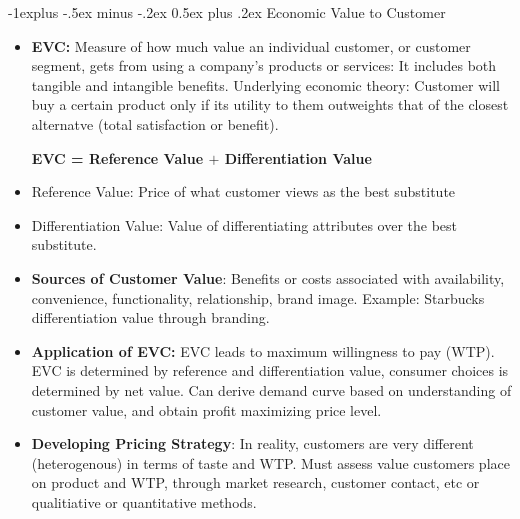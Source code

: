 \documentclass[12pt, landscape]{article}
\makeatletter
\renewcommand{\subsection}{\@startsection{subsection}{2}{0mm}%
                                {-1explus -.5ex minus -.2ex}%
                                {0.5ex plus .2ex}%
                                {\normalfont\normalsize\bfseries}}
\makeatother
\begin{document}
\begin{multicols*}{3}
\subsection{Economic Value to Customer}
\begin{itemize}
\item \textbf{EVC:} Measure of how much value an individual customer, or customer segment, gets from using a company’s products or services: It includes both tangible and intangible benefits. Underlying economic theory: Customer will buy a certain product only if its utility to them outweights that of the closest alternatve (total satisfaction or benefit).
\centerline{\textbf{EVC = Reference Value $+$ Differentiation Value}}
\item Reference Value: Price of what customer views as the best substitute
\item Differentiation Value: Value of differentiating attributes over the best substitute.
\item \textbf{Sources of Customer Value}: Benefits or costs associated with availability, convenience, functionality, relationship, brand image. Example: Starbucks differentiation value through branding. 
\item  \textbf{Application of EVC: } EVC leads to maximum willingness to pay (WTP). EVC is determined by reference and differentiation value, consumer choices is determined by net value. Can derive demand curve based on understanding of customer value, and obtain profit maximizing price level.
\item \textbf{Developing Pricing Strategy}: In reality, customers are very different (heterogenous) in terms of taste and WTP. Must assess value customers place on product and WTP, through market research, customer contact, etc or qualitiative or quantitative methods.
\end{itemize}


\end{multicols*}
\end{document}
